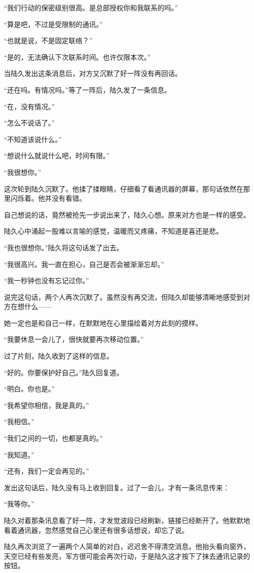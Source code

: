 “我们行动的保密级别很高。是总部授权你和我联系的吗。”

“算是吧，不过是受限制的通讯。”

“也就是说，不是固定联络？”

“是的，无法确认下次联系时间。也许仅限本次。”

当陆久发出这条消息后，对方又沉默了好一阵没有再回话。

“还在吗。有情况吗。”等了一阵后，陆久发了一条信息。

“在，没有情况。”

“怎么不说话了。”

“不知道该说什么。”

“想说什么就说什么吧，时间有限。”

“我很想你。”

这次轮到陆久沉默了。他揉了揉眼睛，仔细看了看通讯器的屏幕，那句话依然在那里闪烁着。他并没有看错。

自己想说的话，竟然被抢先一步说出来了，陆久心想。原来对方也是一样的感受。

陆久心中涌起一股难以言喻的感觉，温暖而又疼痛，不知道是喜还是悲。

“我也很想你。”陆久将这句话发了出去。

“我很高兴。我一直在担心，自己是否会被渐渐忘却。”

“我一秒钟也没有忘记过你。”

说完这句话，两个人再次沉默了。虽然没有再交流，但陆久却能够清晰地感受到对方在想什么——

她一定也是和自己一样，在默默地在心里描绘着对方此刻的摸样。

“我要休息一会儿了，很快就要再次移动位置。”

过了片刻，陆久收到了这样的信息。

“好的。你要保护好自己。”陆久回复道。

“明白。你也是。”

“我希望你相信，我是真的。”

“我相信。”

“我们之间的一切，也都是真的。”

“我知道。”

“还有，我们一定会再见的。”

发出这句话后，陆久没有马上收到回复。过了一会儿，才有一条讯息传来：

“我等你。”

陆久对着那条讯息看了好一阵，才发觉波段已经刷新，链接已经断开了。他默默地看着通讯器，忽然感觉自己心里还有很多话想说，却忘了说。

陆久再次浏览了一遍两个人简单的对白，迟迟舍不得清空消息。他抬头看向窗外，天空已经有些发亮，军方很可能会再次行动，于是陆久这才按下了抹去通讯记录的按钮。


